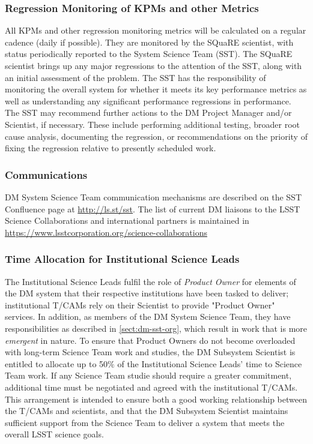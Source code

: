 \subsubsection{Regression Monitoring of KPMs and other Metrics}

All KPMs and other regression monitoring metrics will be calculated on a regular cadence (daily if possible).
They are monitored by the SQuaRE scientist, with status periodically reported to the System Science Team (SST).
The SQuaRE scientist brings up any major regressions to the attention of the SST, along with an initial assessment of the problem.
The SST has the responsibility of monitoring the overall system for whether it meets its key performance metrics as well as understanding any significant performance regressions in performance.
The SST may recommend further actions to the DM Project Manager and/or Scientist, if necessary.
These include performing additional testing, broader root cause analysis, documenting the regression, or recommendations on the priority of fixing the regression relative to presently scheduled work.

\subsubsection{Communications}

DM System Science Team communication mechanisms are described on the SST Confluence page at \url{http://ls.st/sst}. The list of current  DM liaisons to the LSST Science Collaborations and international partners is maintained  in  \url{https://www.lsstcorporation.org/science-collaborations}

\subsubsection{Time Allocation for Institutional Science Leads}

The Institutional Science Leads fulfil the role of {\it Product Owner} for elements of the DM system that their respective institutions have been tasked to deliver; institutional T/CAMs rely on their Scientist to provide  "Product Owner" services. In addition, as members of the DM System Science Team, they have responsibilities as described in \ref{sect:dm-sst-org}, which result in work that is more {\it emergent} in nature. To ensure that Product Owners do not become overloaded with long-term Science Team work and studies, the DM Subsystem Scientist is entitled to allocate up to 50$\%$ of the  Institutional Science Leads'  time to Science Team work. If any Science Team studie should require a greater commitment, additional time must be negotiated and agreed with the institutional T/CAMs. This arrangement is intended to ensure both a good working relationship between the T/CAMs and scientists,  and that the DM Subsystem Scientist maintains sufficient support from the Science Team to deliver a system that meets the overall LSST science goals.


